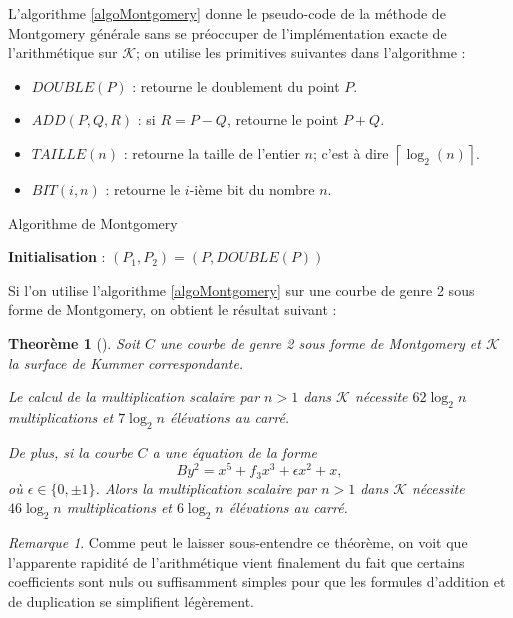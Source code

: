 \documentclass[a4paper,12pt]{article}
\newtheorem{theoreme}{Theorème}[section]
\theoremstyle{definition}
\theoremstyle{remark}
\newtheorem{remarque}{Remarque}
\numberwithin{equation}{section}
\begin{document}
L'algorithme \ref{algoMontgomery} donne le pseudo-code de la méthode de Montgomery générale sans se préoccuper de l'implémentation exacte de l'arithmétique sur $\mathcal{K}$; on utilise les primitives suivantes dans l'algorithme :
\begin{itemize}
\item $DOUBLE(P)$ : retourne le doublement du point $P$.
\item $ADD(P,Q,R)$ : si $R = P-Q$, retourne le point $P+Q$.
\item $TAILLE(n)$ : retourne la taille de l'entier $n$; c'est à dire $\left \lceil{\log_2(n)}\right \rceil$.
\item $BIT(i,n)$ : retourne le $i$-ième bit du nombre $n$.
\end{itemize}

\begin{algorithm}
\label{algoMontgomery}
\caption{Algorithme de Montgomery}
\textbf{Initialisation} : $(P_1,P_2) = (P,DOUBLE(P))$
\BlankLine
{}
\end{algorithm}

Si l'on utilise l'algorithme \ref{algoMontgomery} sur une courbe de genre 2 sous forme de Montgomery, on obtient le résultat suivant :
\begin{theoreme}[\citet{duquesne}]
\label{thduquesne}
Soit $C$ une courbe de genre 2 sous forme de Montgomery et $\mathcal{K}$ la surface de Kummer correspondante.

Le calcul de la multiplication scalaire par $n > 1$ dans $\mathcal{K}$ nécessite $62\log_2 n$ multiplications et $7\log_2 n$ élévations au carré.

De plus, si la courbe $C$ a une équation de la forme
$$By^2 = x^5 + f_3 x^3 + \epsilon x^2 + x,$$
où $\epsilon \in \{0,\pm 1\}$. Alors la multiplication scalaire par $n > 1$ dans $\mathcal{K}$ nécessite $46\log_2 n$ multiplications et $6\log_2 n$ élévations au carré.
\end{theoreme}

\begin{remarque}
Comme peut le laisser sous-entendre ce théorème, on voit que l'apparente rapidité de l'arithmétique vient finalement du fait que certains coefficients sont nuls ou suffisamment simples pour que les formules d'addition et de duplication se simplifient légèrement.
\end{remarque}
\end{document}

